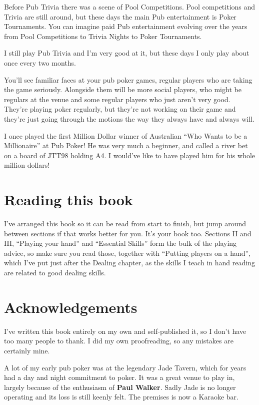 Before Pub Trivia there was a scene of Pool Competitions. Pool competitions
and Trivia are still around, but these days the main Pub entertainment
is Poker Tournaments. You can imagine paid Pub entertainment evolving
over the years from Pool Competitions to Trivia Nights to Poker Tournaments.

I still play Pub Trivia and I'm very good at it, but these days
I only play about once every two months.

You'll see familiar faces at your pub poker games,
regular players who are taking the game seriously. Alongside them
will be more social players, who might be regulars at the venue
and some regular players who just aren't very good. They're playing
poker regularly, but they're not working on their game and they're
just going through the motions the way they always have and always
will.

I once played the first Million Dollar winner of Australian ``Who Wants to
be a Millionaire'' at Pub Poker! He was very much a beginner, and called
a river bet on a board of JTT98 holding A4. I would've like to have played
him for his whole million dollars!

\section*{Reading this book}

I've arranged this book so it can be read from start to finish, but jump
around between sections if that works better for you. It's your book too.
Sections II and III, ``Playing your hand'' and ``Essential Skills'' form
the bulk of the playing advice, so make sure you read those, together
with ``Putting players on a hand'', which I've put just after the
Dealing chapter, as the skills I teach in hand reading are related
to good dealing skills.

\section*{Acknowledgements}

I've written this book entirely on my own and self-published it, so I don't
have too many people to thank. I did my own proofreading, so any mistakes
are certainly mine.

A lot of my early pub poker was at the legendary Jade Tavern,
which for years had a day and night commitment to poker.
It was a great venue to play in, largely because of the enthusiasm
of \textbf{Paul Walker}. Sadly Jade is no longer operating and
its loss is still keenly felt. The premises is now a Karaoke bar.

